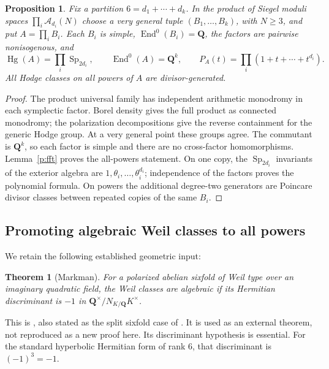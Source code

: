 \documentclass[10pt,reqno]{article}
\theoremstyle{emphasizedplain}
\theoremstyle{emphasizeddefinition}
\theoremstyle{emphasizeddefinition}
\newtheorem{pretheorem}[prelemma]{Theorem}
\newtheorem{preproposition}[prelemma]{Proposition}
\DeclareMathOperator{\End}{End}
\DeclareMathOperator{\Hg}{Hg}
\DeclareMathOperator{\Sp}{Sp}
\newcommand{\Q}{\mathbf Q}
\begin{document}
\begin{preproposition}\label{p:products}
Fix a partition $6=d_1+\cdots+d_k$. In the product of Siegel moduli spaces
$\prod_i\mathcal A_{d_i}(N)$ choose a very general tuple $(B_1,\ldots,B_k)$,
with $N\geq3$, and put $A=\prod_i B_i$. Each $B_i$ is simple,
$\End^0(B_i)=\Q$, the factors are pairwise nonisogenous, and
\[
 \Hg(A)=\prod_i\Sp_{2d_i},\qquad
 \End^0(A)=\Q^k,\qquad
 P_A(t)=\prod_i(1+t+\cdots+t^{d_i}).
\]
All Hodge classes on all powers of $A$ are divisor-generated.
\end{preproposition}
\begin{proof}
The product universal family has independent arithmetic monodromy in each
symplectic factor. Borel density gives the full product as connected
monodromy; the polarization decompositions give the reverse containment
for the generic Hodge group. At a very general point these groups agree.
The commutant is $\Q^k$, so each factor is simple and there are no
cross-factor homomorphisms. Lemma~\ref{p:fft} proves the all-powers statement.
On one copy, the $\Sp_{2d_i}$ invariants of the exterior algebra are
$1,\theta_i,\ldots,\theta_i^{d_i}$; independence of the factors proves the
polynomial formula. On powers the additional degree-two generators are
Poincare divisor classes between repeated copies of the same $B_i$.
\end{proof}

\subsection*{Promoting algebraic Weil classes to all powers}
We retain the following established geometric input:
\begin{pretheorem}[Markman]\label{p:markman}
For a polarized abelian sixfold of Weil type over an imaginary quadratic
field, the Weil classes are algebraic if its Hermitian discriminant is
$-1$ in $\Q^\times/N_{K/\Q}K^\times$.
\end{pretheorem}
This is \cite[Theorem 1.5.1]{Markman}, also stated as the split sixfold case
of \cite[Theorem 1.2]{MarkmanSurvey}. It is used as an external theorem,
not reproduced as a new proof here. Its discriminant hypothesis is essential.
For the standard hyperbolic Hermitian form of rank $6$, that discriminant
is $(-1)^3=-1$.
\end{document}
